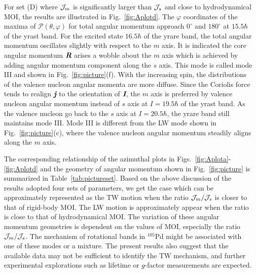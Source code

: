 \documentclass[aps,prc,preprint,showpacs,groupedaddress,floatfix,amsmath,amssymb]{revtex4-1}
\begin{document}
For set (D) where ${\cal J}_m$ is significantly larger than ${\cal J}_s$ and close to hydrodynamical MOI, the results are illustrated in Fig.~\ref{fig:Aplotd}.
The $\varphi$ coordinates of the maxima of $\mathcal{P}(\theta, \varphi)$ for total angular momentum approach $0^{\circ}$ and  $180^{\circ}$ at $15.5\hbar$ of the yrast band.
For the excited state $16.5\hbar$ of the yrare band, the total angular momentum oscillates slightly with respect to the $m$ axis. It is indicated the core angular momentum $\textit{\textbf{R}}$ arises a wobble about the $m$ axis which is achieved by adding angular momentum component along the $s$ axis. This mode is called mode III and shown in Fig.~\ref{fig:picture}(f).
With the increasing spin, the distributions of the valence nucleon angular momenta are more diffuse.
Since the Coriolis force tends to realign $\textit{\textbf{j}}$ to the orientation of $\textit{\textbf{I}}$, the $m$ axis is preferred by valence nucleon angular momentum instead of $s$ axis at $I=19.5\hbar$ of the yrast band.
As the valence nucleon go back to the $s$ axis at $I=20.5\hbar$, the yrare band still maintains mode III.
Mode III is different from the LW mode shown in Fig.~\ref{fig:picture}(c), where the valence nucleon angular momentum steadily aligns along the $m$ axis.


The corresponding relationship of the azimuthal plots in Figs.~\ref{fig:Aplota}-\ref{fig:Aplotd} and the geometry of angular momentum  shown in Fig.~\ref{fig:picture} is summarized in Table~\ref{tab:pictureset}.
Based on the above discussion of the results adopted four sets of parameters,
we get the case which can be approximately represented as the TW motion when the ratio ${\cal J}_m/{\cal J}_s$ is closer to that of rigid-body MOI. The LW motion is approximately appear when the ratio is close to that of hydrodynamical MOI.
The variation of these angular momentum geometries is dependent on the values of  MOI, especially the ratio ${\cal J}_m/{\cal J}_s$. The mechanism of rotational bands in $^{105}$Pd might be associated with one of these modes or a mixture.
The present results also suggest that the
available data may not be sufficient to identify the TW mechanism, and further experimental explorations such as lifetime or
$g$-factor measurements are expected.
\end{document}
